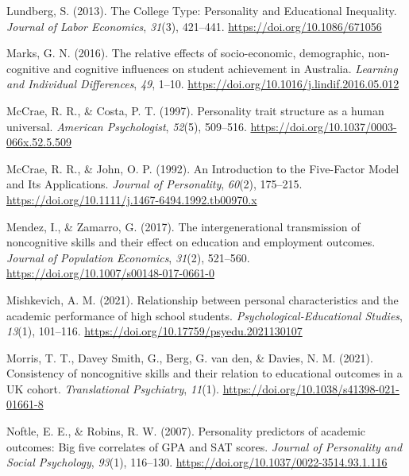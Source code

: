 \documentclass{article}
\newlength{\cslhangindent}
\newlength{\cslentryspacingunit} %
\newenvironment{CSLReferences}[2] %
 {%
  \setlength{\parindent}{0pt}
  \ifodd #1
  \let\oldpar\par
  \def\par{\hangindent=\cslhangindent\oldpar}
  \fi
  \setlength{\parskip}{#2\cslentryspacingunit}
 }%
 {}
\begin{document}
\begin{CSLReferences}{1}{0}
\leavevmode{}%
Lundberg, S. (2013). The College Type: Personality and Educational
Inequality. \emph{Journal of Labor Economics}, \emph{31}(3), 421--441.
\url{https://doi.org/10.1086/671056}

\leavevmode{}%
Marks, G. N. (2016). The relative effects of socio-economic,
demographic, non-cognitive and cognitive influences on student
achievement in Australia. \emph{Learning and Individual Differences},
\emph{49}, 1--10. \url{https://doi.org/10.1016/j.lindif.2016.05.012}

\leavevmode{}%
McCrae, R. R., \& Costa, P. T. (1997). Personality trait structure as a
human universal. \emph{American Psychologist}, \emph{52}(5), 509--516.
\url{https://doi.org/10.1037/0003-066x.52.5.509}

\leavevmode{}%
McCrae, R. R., \& John, O. P. (1992). An Introduction to the
Five{-}Factor Model and Its Applications. \emph{Journal of Personality},
\emph{60}(2), 175--215.
\url{https://doi.org/10.1111/j.1467-6494.1992.tb00970.x}

\leavevmode{}%
Mendez, I., \& Zamarro, G. (2017). The intergenerational transmission of
noncognitive skills and their effect on education and employment
outcomes. \emph{Journal of Population Economics}, \emph{31}(2),
521--560. \url{https://doi.org/10.1007/s00148-017-0661-0}

\leavevmode{}%
Mishkevich, A. M. (2021). Relationship between personal characteristics
and the academic performance of high school students.
\emph{Psychological-Educational Studies}, \emph{13}(1), 101--116.
\url{https://doi.org/10.17759/psyedu.2021130107}

\leavevmode{}%
Morris, T. T., Davey Smith, G., Berg, G. van den, \& Davies, N. M.
(2021). Consistency of noncognitive skills and their relation to
educational outcomes in a UK cohort. \emph{Translational Psychiatry},
\emph{11}(1). \url{https://doi.org/10.1038/s41398-021-01661-8}

\leavevmode{}%
Noftle, E. E., \& Robins, R. W. (2007). Personality predictors of
academic outcomes: Big five correlates of GPA and SAT scores.
\emph{Journal of Personality and Social Psychology}, \emph{93}(1),
116--130. \url{https://doi.org/10.1037/0022-3514.93.1.116}


\end{CSLReferences}
\end{document}
